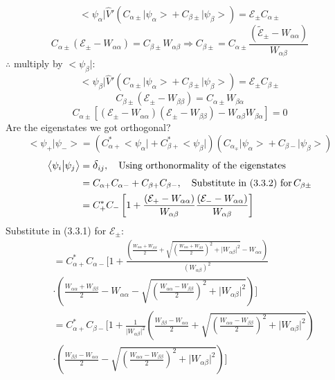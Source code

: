 \documentclass[12pt,fancychapters]{report}
\numberwithin{equation}{section}
\begin{document}
\[
  \big<\psi_\alpha\big|\hat{V}'\left(C_{\alpha\pm}\big|\psi_{\alpha}\big> + C_{\beta\pm} 
  \big|\psi_\beta\big>\right) = \mathcal{E}_\pm C_{\alpha\pm}
\]
\begin{equation}
  C_{\alpha\pm} \left(\mathcal{E}_\pm - W_{\alpha\alpha}\right) = C_{\beta\pm}W_{\alpha\beta}
  \Rightarrow C_{\beta\pm}=C_{\alpha\pm}\frac{\left(\tilde{\mathcal{E}}_\pm - W_{\alpha\alpha}
  \right)}{W_{\alpha\beta}}
\end{equation}
$\therefore$ multiply by $\big<\psi_\beta\big|$:
\[
   \big<\psi_\beta\big|\hat{V}'\left(C_{\alpha\pm}\big|\psi_{\alpha}\big> + C_{\beta\pm} 
  \big|\psi_\beta\big>\right) = \mathcal{E}_\pm C_{\beta\pm}
\]
\[
  C_{\beta\pm} \left(\mathcal{E}_\pm - W_{\beta\beta}\right) = C_{\alpha\pm}W_{\beta\alpha}
\]
\[
  C_{\alpha\pm} \left[\left( \mathcal{E}_\pm - W_{\alpha\alpha}\right) 
  \left(\mathcal{E}_\pm - W_{\beta\beta}\right) - W_{\alpha\beta}W_{\beta\alpha}\right] = 0
\]
Are the eigenstates we got orthogonal?
\[
  \big<\psi_+\big|\psi_-\big> = \left(C_{\alpha +}^*\big<\psi_\alpha\big| + C_{\beta +}^* 
  \big<\psi_\beta\big|\right)\left(C_{\alpha_\mp}\big|\psi_\alpha \big> + C_{\beta -}
  \big|\psi_\beta\big>\right)
\]
\begin{align*}
  \big<\psi_i\big|\psi_j\big> &= \mathlarger{\delta}_{ij},\quad \text{Using orthonormality of the eigenstates}\\
&= C_{\alpha +}C_{\alpha -}+ C_{\beta +}C_{\beta -}, \quad \text{Substitute in (3.3.2) for}
\,C_{\beta\pm}\\
&= C^*_+ C_- \left[1 + \frac{\left(\mathcal{E}_+ - W_{\alpha\alpha}\right)}{W_{\alpha\beta}}
\frac{\left(\mathcal{E}_- - W_{\alpha\alpha}\right)}{W_{\alpha\beta}}\right]
\end{align*}
Substitute in (3.3.1) for $\mathcal{E}_\pm$:
\begin{align*}
  &=C^*_{\alpha +}C_{\alpha -} \Biggl[1+\frac{\left(\frac{W_{\alpha\alpha}+W_{\beta\beta}}{2} +
  \sqrt{\left(\frac{W_{\alpha\alpha}+W_{\beta\beta}}{2}\right)^2 + \big|W_{\alpha\beta}
\big|^2 }-W_{\alpha\alpha}\right)  }{\left(W_{\alpha\beta}\right)^2}\\
  &\cdot\left(\frac{W_{\alpha\alpha}+W_{\beta\beta}}{2} - W_{\alpha\alpha} - \sqrt{
\left(\frac{W_{\alpha\alpha}-W_{\beta\beta}}{2}\right)^2+\big|W_{\alpha\beta}\big|^2}\right)\Biggr]\\
&=C^*_{\alpha +}C_{\beta -}\Bigg[1+\frac{1}{\big|W_{\alpha\beta}\big|^2} 
\left(\frac{W_{\beta\beta}-W_{\alpha\alpha}}{2} +
\sqrt{\left(\frac{W_{\alpha\alpha}-W_{\beta\beta}}{2}\right)^2 + \big|W_{\alpha\beta}
\big|^2 }\right)\\
&\cdot\left(\frac{W_{\beta\beta}-W_{\alpha\alpha}}{2}-
\sqrt{\left(\frac{W_{\alpha\alpha}-W_{\beta\beta}}{2}\right)^2 + \big|W_{\alpha\beta}
\big|^2 }\right)\Bigg] 
\end{align*}
\end{document}
